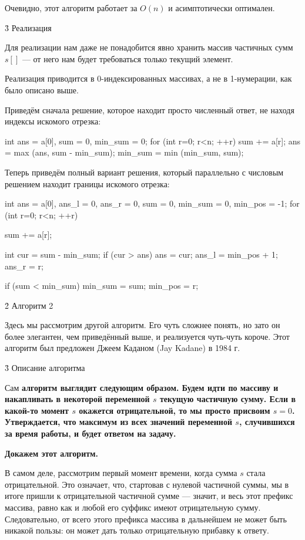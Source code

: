 Очевидно, этот алгоритм работает за $O(n)$ и асимптотически оптимален.

\h3{ Реализация }

Для реализации нам даже не понадобится явно хранить массив частичных сумм $s[]$ --- от него нам будет требоваться только текущий элемент.

Реализация приводится в 0-индексированных массивах, а не в 1-нумерации, как было описано выше.

Приведём сначала решение, которое находит просто численный ответ, не находя индексы искомого отрезка:

\code
int ans = a[0],
	sum = 0,
	min_sum = 0;
for (int r=0; r<n; ++r) {
	sum += a[r];
	ans = max (ans, sum - min_sum);
	min_sum = min (min_sum, sum);
}
\endcode

Теперь приведём полный вариант решения, который параллельно с числовым решением находит границы искомого отрезка:

\code
int ans = a[0],
	ans_l = 0,
	ans_r = 0,
	sum = 0,
	min_sum = 0,
	min_pos = -1;
for (int r=0; r<n; ++r) {
	sum += a[r];

	int cur = sum - min_sum;
	if (cur > ans) {
		ans = cur;
		ans_l = min_pos + 1;
		ans_r = r;
	}

	if (sum < min_sum) {
		min_sum = sum;
		min_pos = r;
	}
}
\endcode


\h2{ Алгоритм 2 }

Здесь мы рассмотрим другой алгоритм. Его чуть сложнее понять, но зато он более элегантен, чем приведённый выше, и реализуется чуть-чуть короче. Этот алгоритм был предложен Джеем Каданом (Jay Kadane) в 1984 г.

\h3{ Описание алгоритма }

Сам \bf{алгоритм} выглядит следующим образом. Будем идти по массиву и накапливать в некоторой переменной $s$ текущую частичную сумму. Если в какой-то момент $s$ окажется отрицательной, то мы просто присвоим $s=0$. Утверждается, что максимум из всех значений переменной $s$, случившихся за время работы, и будет ответом на задачу.

\bf{Докажем} этот алгоритм.

В самом деле, рассмотрим первый момент времени, когда сумма $s$ стала отрицательной. Это означает, что, стартовав с нулевой частичной суммы, мы в итоге пришли к отрицательной частичной сумме --- значит, и весь этот префикс массива, равно как и любой его суффикс имеют отрицательную сумму. Следовательно, от всего этого префикса массива в дальнейшем не может быть никакой пользы: он может дать только отрицательную прибавку к ответу.

